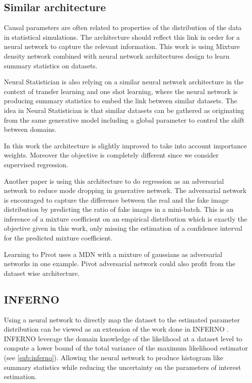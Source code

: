 \subsection{Similar architecture} %
\label{sub:similar_architecture}

Causal parameters are often related to properties of the distribution of the data in statistical simulations.
The architecture should reflect this link in order for a neural network to capture the relevant information.
This work is using Mixture density network \cite{Bishop94mixturedensity} combined with neural network architectures design to learn summary statistics on datasets.

Neural Statistician \cite{Edwards17neuralstatistician} is also relying on a similar neural network architecture in the context of transfer learning and one shot learning, where the neural network is producing summary statistics to embed the link between similar datasets.
The idea in Neural Statistician is that similar datasets can be gathered as originating from the same generative model including a global parameter to control the shift between domains.

In this work the architecture is slightly improved to take into account importance weights.
Moreover the objective is completely different since we consider supervised regression.


Another paper \cite{lucas:hal-01791126} is using this architecture to do regression as an adversarial network to reduce mode dropping in generative network.
The adversarial network is encouraged to capture the difference between the real and the fake image distribution by predicting the ratio of fake images in a mini-batch.
This is an inference of a mixture coefficient on an empirical distribution which is exactly the objective given in this work, only missing the estimation of a confidence interval for the predicted mixture coefficient.

Learning to Pivot \cite{louppe_learning_2016} uses a MDN with a mixture of gaussians as adversarial networks in one example.
Pivot adversarial network could also profit from the dataset wise architecture.




\subsection{INFERNO} %
\label{sub:inferno}

Using a neural network to directly map the dataset to the estimated parameter distribution can be viewed as an extension of the work done in INFERNO \cite{DECASTRO2019170inferno}. 
INFERNO leverage the domain knowledge of the likelihood at a dataset level to compute a lower bound of the total variance of the maximum likelihood estimator (see \autoref{sub:inferno}).
Allowing the neural network to produce histogram like summary statistics while reducing the uncertainty on the parameters of interest estimation.

